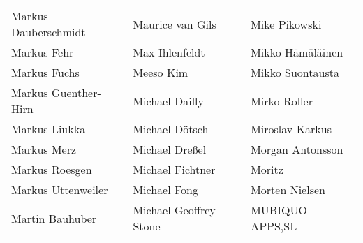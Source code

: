 \begin{tabular}{p{4.5cm}p{4.5cm}p{4.5cm}}
Markus Dauberschmidt & Maurice van Gils & Mike Pikowski \\
Markus Fehr & Max Ihlenfeldt & Mikko Hämäläinen \\
Markus Fuchs & Meeso Kim & Mikko Suontausta \\
Markus Guenther-Hirn & Michael Dailly & Mirko Roller \\
Markus Liukka & Michael Dötsch & Miroslav Karkus \\
Markus Merz & Michael Dreßel & Morgan Antonsson \\
Markus Roesgen & Michael Fichtner & Moritz \\
Markus Uttenweiler & Michael Fong & Morten Nielsen \\
Martin Bauhuber & Michael Geoffrey Stone & MUBIQUO APPS,SL \\
\end{tabular}
\newpage
\setlength{\tabcolsep}{1mm}
